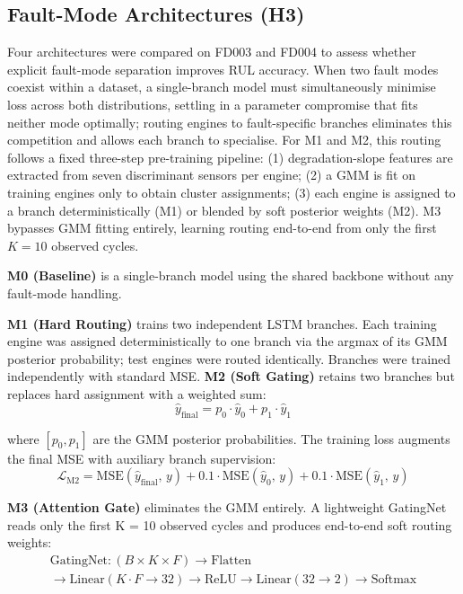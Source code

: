 \documentclass[review,12pt]{elsarticle}
\begin{document}
\subsection{Fault-Mode Architectures (H3)}

Four architectures were compared on FD003 and FD004 to assess whether explicit fault-mode separation improves RUL accuracy. When two fault modes coexist within a dataset, a single-branch model must simultaneously minimise loss across both distributions, settling in a parameter compromise that fits neither mode optimally; routing engines to fault-specific branches eliminates this competition and allows each branch to specialise. For M1 and M2, this routing follows a fixed three-step pre-training pipeline: (1) degradation-slope features are extracted from seven discriminant sensors per engine; (2) a GMM is fit on training engines only to obtain cluster assignments; (3) each engine is assigned to a branch deterministically (M1) or blended by soft posterior weights (M2). M3 bypasses GMM fitting entirely, learning routing end-to-end from only the first $K = 10$ observed cycles.

\textbf{M0 (Baseline)} is a single-branch model using the shared backbone without any fault-mode handling.

\textbf{M1 (Hard Routing)} trains two independent LSTM branches. Each training engine was assigned deterministically to one branch via the argmax of its GMM posterior probability; test engines were routed identically. Branches were trained independently with standard MSE. \textbf{M2 (Soft Gating)} retains two branches but replaces hard assignment with a weighted sum:
\begin{equation}
\hat{y}_{\text{final}} = p_0 \cdot \hat{y}_0 + p_1 \cdot \hat{y}_1
\end{equation}

where $[p_0, p_1]$ are the GMM posterior probabilities. The training loss augments the final MSE with auxiliary branch supervision:
\begin{equation}
\mathcal{L}_{\text{M2}} = \text{MSE}(\hat{y}_{\text{final}},\, y) + 0.1\cdot\text{MSE}(\hat{y}_0,\, y) + 0.1\cdot\text{MSE}(\hat{y}_1,\, y)
\end{equation}

\textbf{M3 (Attention Gate)} eliminates the GMM entirely. A lightweight GatingNet reads only the first K = 10 observed cycles and produces end-to-end soft routing weights:
\begin{multline}
\text{GatingNet}: (B \times K \times F) \to \text{Flatten} \\
\to \text{Linear}(K{\cdot}F \to 32) \to \text{ReLU} \to \text{Linear}(32 \to 2) \to \text{Softmax}
\end{multline}
\end{document}

